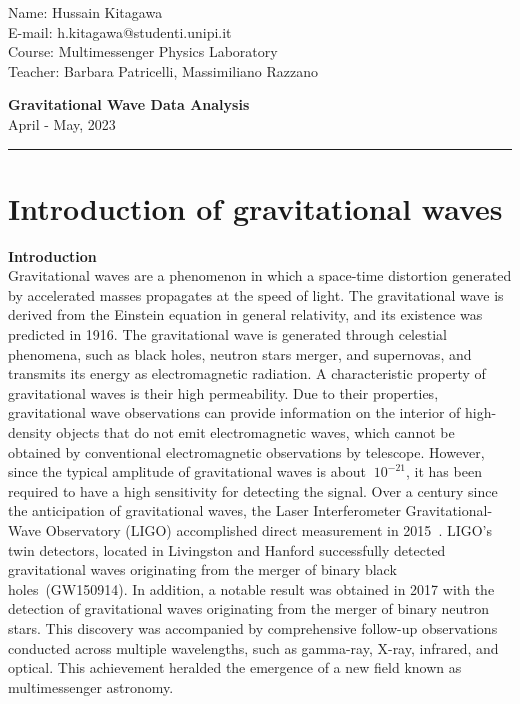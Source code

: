 \documentclass[11pt, letterpaper]{article}
\makeatletter
\newcommand*{\name}{Hussain Kitagawa}
\newcommand*{\mail}{h.kitagawa@studenti.unipi.it}
\newcommand*{\course}{Multimessenger Physics Laboratory}
\newcommand*{\teacher}{Barbara Patricelli, Massimiliano Razzano}
\newcommand*{\assignment}{April - May, 2023}
\makeatother
\begin{document}
\begin{flushleft}
    Name: \name \\
    E-mail: \mail\\
    Course: \course\\
    Teacher: \teacher\\
\end{flushleft}

\begin{center}
    \textbf{\large Gravitational Wave Data Analysis}\\
    \assignment 
\end{center}

\rule{\linewidth}{0.1mm}

\bigskip
\bigskip



\section{Introduction of gravitational waves}
\textbf{Introduction}\\
Gravitational waves are a phenomenon in which a space-time distortion generated by accelerated masses propagates at the speed of light. The gravitational wave is derived from the Einstein equation in general relativity, and its existence was predicted in 1916. The gravitational wave is generated through celestial phenomena,  such as black holes, neutron stars merger, and supernovas, and transmits its energy as electromagnetic radiation. A characteristic property of gravitational waves is their high permeability. Due to their properties, gravitational wave observations can provide information on the interior of high-density objects that do not emit electromagnetic waves, which cannot be obtained by conventional electromagnetic observations by telescope. However, since the typical amplitude of gravitational waves is about $~10^{-21}$, it has been required to have a high sensitivity for detecting the signal. Over a century since the anticipation of gravitational waves, the Laser Interferometer Gravitational-Wave Observatory (LIGO) accomplished direct measurement in 2015~\cite{Abbott_2016}. LIGO's twin detectors, located in Livingston and Hanford successfully detected gravitational waves originating from the merger of binary black holes~(GW150914). In addition, a notable result was obtained in 2017 with the detection of gravitational waves originating from the merger of binary neutron stars. This discovery was accompanied by comprehensive follow-up observations conducted across multiple wavelengths, such as gamma-ray, X-ray, infrared, and optical. This achievement heralded the emergence of a new field known as multimessenger astronomy.
\end{document}
